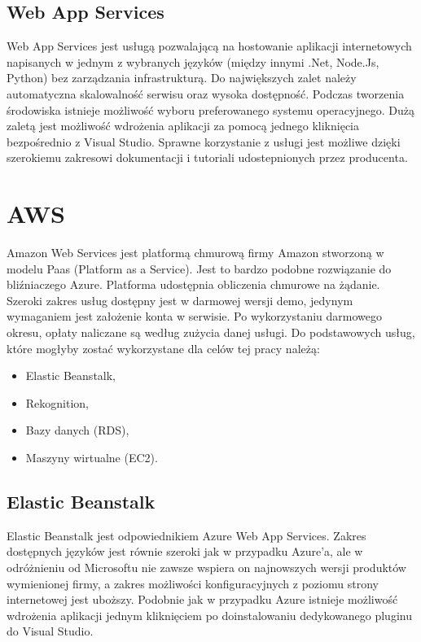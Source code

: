 \subsection{Web App Services}
Web App Services jest usługą pozwalającą na hostowanie aplikacji internetowych napisanych w jednym z wybranych języków (między innymi .Net, Node.Js, Python) bez zarządzania infrastrukturą. Do największych zalet należy automatyczna skalowalność serwisu oraz wysoka dostępność. Podczas tworzenia środowiska istnieje możliwość wyboru preferowanego systemu operacyjnego. Dużą zaletą jest możliwość wdrożenia aplikacji za pomocą jednego kliknięcia bezpośrednio z Visual Studio. Sprawne korzystanie z usługi jest możliwe dzięki szerokiemu zakresowi dokumentacji i tutoriali udostepnionych przez producenta.

\section{AWS} \label{aws}
Amazon Web Services jest platformą chmurową firmy Amazon stworzoną w modelu Paas (Platform as a Service). Jest to bardzo podobne rozwiązanie do bliźniaczego Azure. Platforma udostępnia obliczenia chmurowe na żądanie. Szeroki zakres usług dostępny jest w darmowej wersji demo, jedynym wymaganiem jest założenie konta w serwisie. Po wykorzystaniu darmowego okresu, opłaty naliczane są według zużycia danej usługi. Do podstawowych usług, które mogłyby zostać wykorzystane dla celów tej pracy należą:
\begin{itemize}
    \item Elastic Beanstalk,
    \item Rekognition,
    \item Bazy danych (RDS),
    \item Maszyny wirtualne (EC2).
\end{itemize}
\subsection{Elastic Beanstalk}
Elastic Beanstalk jest odpowiednikiem Azure Web App Services. Zakres dostępnych języków jest równie szeroki jak w przypadku Azure'a, ale w odróżnieniu od Microsoftu nie zawsze wspiera on najnowszych wersji produktów wymienionej firmy, a zakres możliwości konfiguracyjnych z poziomu strony internetowej jest uboższy. Podobnie jak w przypadku Azure istnieje możliwość wdrożenia aplikacji jednym kliknięciem po doinstalowaniu dedykowanego pluginu do Visual Studio.